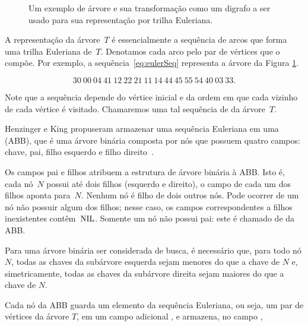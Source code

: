 \begin{figure}[htb]
\centering


\caption{Um exemplo de árvore e sua transformação como um digrafo a ser usado para sua representação por trilha Euleriana.}
\label{fig:exemploSeqEuler}
\end{figure}

A representação da árvore~$T$ é essencialmente a sequência de arcos que forma uma trilha Euleriana de~$T$.
Denotamos cada arco pelo par de vértices que o compõe.
Por exemplo, a sequência~\eqref{eq:eulerSeq} representa a árvore da  Figura \ref{fig:exemploSeqEuler}.

\begin{equation}
30~00~04~41~12~22~21~11~14~44~45~55~54~40~03~33.\label{eq:eulerSeq}  
\end{equation}

Note que a sequência depende do vértice inicial e da ordem em que cada vizinho de cada vértice é visitado. Chamaremos uma tal sequência de  da árvore~$T$.

Henzinger e King \cite{HenzingerKing} propuseram armazenar uma sequência Euleriana em uma  (ABB), que é uma árvore binária composta por nós que possuem  quatro campos: chave, pai, filho esquerdo e filho direito~\cite{CLRS}.

Os campos pai e filhos atribuem a estrutura de árvore binária à ABB. Isto é, cada nó~$N$ possui até dois filhos (esquerdo e direito), o campo  de cada um dos filhos aponta para~$N$. Nenhum nó é filho de dois outros nós. Pode ocorrer de um nó não possuir algum dos filhos; nesse caso, os campos correspondentes a filhos inexistentes contêm~$\text{NIL}$. Somente um nó não possui pai: este é chamado de  da ABB.

Para uma árvore binária ser considerada de busca, é necessário que, para todo nó $N$, todas as chaves da subárvore esquerda sejam menores do que a chave de $N$ e, simetricamente, todas as chaves da subárvore direita sejam maiores do que a chave de $N$.

Cada nó da ABB guarda um elemento da sequência Euleriana, ou seja, um par de vértices da árvore $T$, em um campo adicional , e armazena, no campo , 

